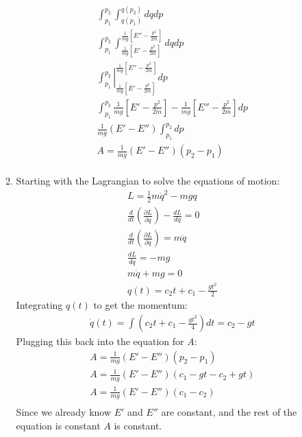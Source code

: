 \documentclass[12pt]{article}
\newcommand{\p}[2]{\frac{\partial #1}{\partial #2}}
\newcommand{\der}[2]{\frac{d #1}{d #2}}
\begin{document}
\begin{enumerate}
\begin{enumerate}
\begin{gather*}
        \int_{p_1}^{p_2}\int_{q(p_1)}^{q(p_2)}dqdp\\
        \int_{p_1}^{p_2}\int_{\frac{1}{mg}\left[E'-\frac{p^2}{2m}\right]}^{\frac{1}{mg}\left[E''-\frac{p^2}{2m}\right]}dqdp\\
        \left.\int_{p_1}^{p_2}\right|_{\frac{1}{mg}\left[E'-\frac{p^2}{2m}\right]}^{\frac{1}{mg}\left[E''-\frac{p^2}{2m}\right]}dp\\
        \left.\int_{p_1}^{p_2}\frac{1}{mg}\left[E'-\frac{p^2}{2m}\right]-\frac{1}{mg}\left[E''-\frac{p^2}{2m}\right]dp\\
        \frac{1}{mg}(E'-E'')\left.\int_{p_1}^{p_2}dp\\
        A=\frac{1}{mg}(E'-E'')(p_2-p_1)\\
      \end{gather*}
      \item
      Starting with the Lagrangian to solve the equations of motion:
      \begin{gather*}
        L=\frac{1}{2}m\dot{q}^2-mgq\\
        \frac{d}{dt}\left(\p{L}{\dot{q}}\right)-\der{L}{q}=0\\
        \frac{d}{dt}\left(\p{L}{\dot{q}}\right)=m\ddot{q}\\
        \der{L}{q}=-mg\\
        m\ddot{q}+mg=0\\
        q(t)=c_2 t+c_1-\frac{gt^2}{2}
      \end{gather*}
      Integrating $q(t)$ to get the momentum:
      \begin{gather*}
        \dot{q}(t)=\int\left( c_2 t+c_1-\frac{gt^2}{4} \right) dt=c_2-gt
      \end{gather*}
      Plugging this back into the equation for $A$:
      \begin{gather*}
        A=\frac{1}{mg}(E'-E'')(p_2-p_1)\\
        A=\frac{1}{mg}(E'-E'')(c_1-gt-c_2+gt)\\
        A=\frac{1}{mg}(E'-E'')(c_1-c_2)\\
      \end{gather*}
      Since we already know $E'$ and $E''$ are constant, and the rest of the equation is constant $A$ is constant.
    \end{enumerate}
  \end{enumerate}
\end{document}

